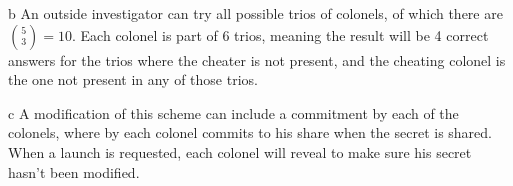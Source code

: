 \documentclass{article}
\begin{document}
\begin{paragraph}
    b An outside investigator can try all possible trios of colonels, of which there are
    $\binom{5}{3} = 10$. Each colonel is part of 6 trios, meaning the result will be 4 correct
    answers for the trios where the cheater is not present, and the cheating colonel is the one
    not present in any of those trios.
\end{paragraph}

\begin{paragraph}
    c A modification of this scheme can include a commitment by each of the colonels, where by
    each colonel commits to his share when the secret is shared. When a launch is requested,
    each colonel will reveal to make sure his secret hasn't been modified.
\end{paragraph}
\end{document}
